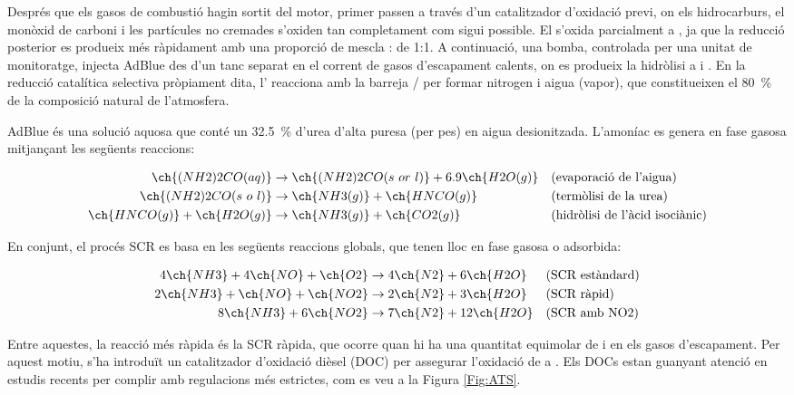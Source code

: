 Després que els gasos de combustió hagin sortit del motor, primer passen a través d'un catalitzador d'oxidació previ, on els hidrocarburs, el monòxid de carboni i les partícules no cremades s'oxiden tan completament com sigui possible. El  s'oxida parcialment a , ja que la reducció posterior es produeix més ràpidament amb una proporció de mescla  :  de 1:1. A continuació, una bomba, controlada per una unitat de monitoratge, injecta AdBlue des d'un tanc separat en el corrent de gasos d'escapament calents, on es produeix la hidròlisi a  i . En la reducció catalítica selectiva pròpiament dita, l' reacciona amb la barreja / per formar nitrogen i aigua (vapor), que constitueixen el 80~\% de la composició natural de l'atmosfera.

AdBlue és una solució aquosa que conté un \qty{32.5}{\percent} d'urea d'alta puresa (per pes) en aigua desionitzada. L'amoníac es genera en fase gasosa mitjançant les següents reaccions\cite{selleri_overview_2021}:

\begin{align}
    \ch{(NH2)2CO(aq)} &\rightarrow \ch{(NH2)2CO(s\ or\ l)} + 6.9 \ch{H2O(g)} && \text{(evaporació de l'aigua)} \\
    \ch{(NH2)2CO(s\ o\ l)} &\rightarrow \ch{NH3(g)} + \ch{HNCO(g)} && \text{(termòlisi de la urea)} \\
    \ch{HNCO(g)} + \ch{H2O(g)} &\rightarrow \ch{NH3(g)} + \ch{CO2(g)} && \text{(hidròlisi de l'àcid isociànic)}
\end{align}

En conjunt, el procés SCR es basa en les següents reaccions globals, que tenen lloc en fase gasosa o adsorbida:

\begin{align}
    4 \ch{NH3} + 4 \ch{NO} + \ch{O2} &\rightarrow 4 \ch{N2} + 6 \ch{H2O} && \text{(SCR estàndard)} \\
    2 \ch{NH3} + \ch{NO} + \ch{NO2} &\rightarrow 2 \ch{N2} + 3 \ch{H2O} && \text{(SCR ràpid)} \\
    8 \ch{NH3} + 6 \ch{NO2} &\rightarrow 7 \ch{N2} + 12 \ch{H2O} && \text{(SCR amb NO2)}
\end{align}

Entre aquestes, la reacció més ràpida és la SCR ràpida, que ocorre quan hi ha una quantitat equimolar de  i  en els gasos d'escapament. Per aquest motiu, s'ha introduït un catalitzador d'oxidació dièsel (DOC) per assegurar l'oxidació de  a . Els DOCs estan guanyant atenció en estudis recents per complir amb regulacions més estrictes, com es veu a la Figura \ref{Fig:ATS}.


